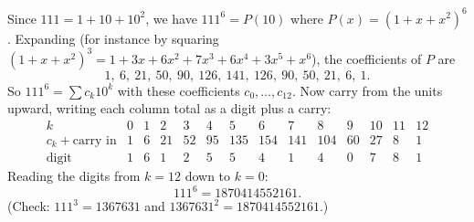 Since $111=1+10+10^2$, we have $111^6=P(10)$ where $P(x)=(1+x+x^2)^6$. Expanding (for instance by squaring $(1+x+x^2)^3=1+3x+6x^2+7x^3+6x^4+3x^5+x^6$), the coefficients of $P$ are
\[
1,\ 6,\ 21,\ 50,\ 90,\ 126,\ 141,\ 126,\ 90,\ 50,\ 21,\ 6,\ 1.
\]
So $111^6=\sum c_k10^k$ with these coefficients $c_0,\dots,c_{12}$. Now carry from the units upward, writing each column total as a digit plus a carry:
\[
\begin{array}{c|ccccccccccccc}
k & 0&1&2&3&4&5&6&7&8&9&10&11&12\\\hline
c_k+\text{carry in} & 1&6&21&52&95&135&154&141&104&60&27&8&1\\
\text{digit} & 1&6&1&2&5&5&4&1&4&0&7&8&1
\end{array}
\]
Reading the digits from $k=12$ down to $k=0$:
\[
111^6=\boxed{1870414552161}.
\]
(Check: $111^3=1367631$ and $1367631^2=1870414552161$.)
